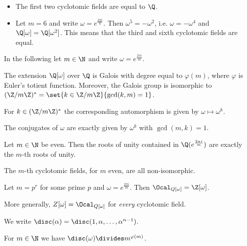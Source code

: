 	\begin{exmp*}
		\begin{itemize}
			\item The first two cyclotomic fields are equal to \( \Q \).
			\item Let \( m = 6 \) and write \( \omega = e^\frac{2\pi i}{6} \).
		Then \( \omega^5 = -\omega^2 \), i.e. \( \omega = -\omega^4 \) and \( \Q[\omega] = \Q[\omega^2] \).
		This means that the third and sixth cyclotomic fields are equal.
		
		\end{itemize}
	\end{exmp*}
			

In the following let \( m \in \N \) and write \( \omega = e^\frac{2\pi i}{m} \).

\begin{thmn}
	The extension \( \Q[\omega] \) over \( \Q \) is Galois with degree equal to \( \varphi(m) \), where \( \varphi \) is Euler's totient function.
	Moreover, the Galois group is isomorphic to \( (\Z/m\Z)^* = \set{k \in \Z/m\Z}{\gcd(k,m)=1} \).
\end{thmn}

For \( k \in (\Z/m\Z)^* \) the corresponding automorphism is given by \( \omega \mapsto \omega^k \).

\begin{prop}
	The conjugates of \( \omega \) are exactly given by \( \omega^k \) with \( \gcd(m,k)=1 \).
\end{prop}

\begin{cor}
	Let \( m \in \N \) be even.
	Then the roots of unity contained in \( \Q(e^\frac{2\pi i}{m}) \) are exactly the \( m \)-th roots of unity.
\end{cor}

\begin{cor}
	The \( m \)-th cyclotomic fields, for \( m \) even, are all non-isomorphic.
\end{cor}

\begin{thmn}
	Let \( m=p^r \) for some prime \( p \) and \( \omega = e^\frac{2\pi i}{m} \).
	Then \( \Ocal_{Q[\omega]} = \Z[\omega] \).
\end{thmn}

\begin{rem*}
More generally, \( Z[\omega] = \Ocal_{Q[\omega]} \) for \emph{every} cyclotomic field.
\end{rem*}

\begin{notat*}
	We write \( \disc(\alpha) = \disc(1, \alpha, \dotsc, \alpha^{n-1}) \).
\end{notat*}

\begin{lem}
	For \( m \in \N \) we have \( \disc(\omega) \divides m^{\varphi(m)} \).
\end{lem}